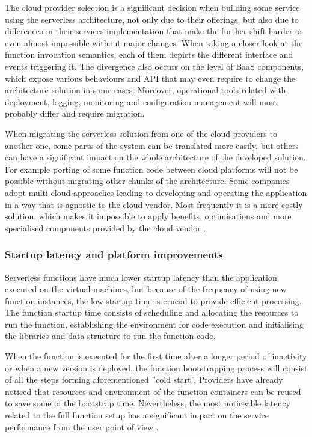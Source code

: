 The cloud provider selection is a significant decision when building some service using the serverless architecture, not only due to their offerings, but also due to differences in their services implementation that make the further shift harder or even almost impossible without major changes. When taking a closer look at the function invocation semantics, each of them depicts the different interface and events triggering it. The divergence also occurs on the level of BaaS components, which expose various behaviours and API that may even require to change the architecture solution in some cases. Moreover, operational tools related with deployment, logging, monitoring and configuration management will most probably differ and require migration.

When migrating the serverless solution from one of the cloud providers to another one, some parts of the system can be translated more easily, but others can have a significant impact on the whole architecture of the developed solution. For example porting of some function code between cloud platforms will not be possible without migrating other chunks of the architecture. Some companies adopt multi-cloud approaches leading to developing and operating the application in a way that is agnostic to the cloud vendor. Most frequently it is a more costly solution, which makes it impossible to apply benefits, optimisations and more specialised components provided by the cloud vendor \cite{MartinFowlerServerless}.

\subsubsection{Startup latency and platform improvements} \label{chapter:serverless-startup-latency-and-platform-improvements}

Serverless functions have much lower startup latency than the application executed on the virtual machines, but because of the frequency of using new function instances, the low startup time is crucial to provide efficient processing. The function startup time consists of scheduling and allocating the resources to run the function, establishing the environment for code execution and initialising the libraries and data structure to run the function code.

When the function is executed for the first time after a longer period of inactivity or when a new version is deployed, the function bootstrapping process will consist of all the steps forming aforementioned ''cold start''. Providers have already noticed that resources and environment of the function containers can be reused to save some of the bootstrap time. Nevertheless, the most noticeable latency related to the full function setup has a significant impact on the service performance from the user point of view \cite{BerkeleyServerless}.

